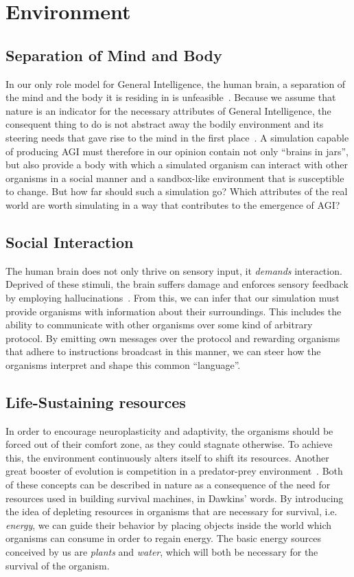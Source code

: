\section{Environment}

\subsection{Separation of Mind and Body}
In our only role model for General Intelligence, the human brain, a separation of the mind and
the body it is residing in is unfeasible~\cite{Dudai2014}. Because we assume that nature is an 
indicator for the necessary attributes of General Intelligence, the consequent thing to do is not 
abstract away the bodily environment and its steering needs that gave rise to the mind in the first place~\cite{Jekely2010}. 
A simulation capable of producing AGI must therefore in our opinion contain not only ``brains in jars'', but 
also provide a body with which a simulated organism can interact with other organisms in a social manner and a 
sandbox-like environment that is susceptible to change.
But how far should such a simulation go? Which attributes of the real world are worth simulating in a way 
that contributes to the emergence of AGI\@?

\subsection{Social Interaction}
The human brain does not only thrive on sensory input, it
\emph{demands} interaction. Deprived of these stimuli,
the brain suffers damage and enforces sensory feedback by employing
hallucinations~\cite{Grassian2006}. From this, we can infer that
our simulation must provide organisms with information about their surroundings.
This includes the ability to communicate with other organisms over some
kind of arbitrary protocol. By emitting own messages over the protocol and
rewarding organisms that adhere to instructions broadcast in this manner,
we can steer how the organisms interpret and shape this common ``language''.

\subsection{Life-Sustaining resources}
In order to encourage neuroplasticity and adaptivity, the organisms should be 
forced out of their comfort zone, as they could stagnate otherwise.
To achieve this, the environment continuously alters itself to shift its resources.
Another great booster of evolution is competition in a predator-prey environment~\cite{Dawkins1982}.
Both of these concepts can be described in nature as a consequence of the need for resources 
used in building survival machines, in Dawkins' words. 
By introducing the idea of depleting resources in organisms that are necessary for survival, 
i.e. \emph{energy}, we can guide their behavior by placing objects inside the world which organisms can consume
in order to regain energy. The basic energy sources conceived by us are \emph{plants} and \emph{water}, which will
both be necessary for the survival of the organism.

